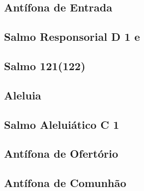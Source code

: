\subsection{Antífona de Entrada}\label{subsection:tempus-adventus/missa-2/introitus}

\subsection[Salmo Responsorial]{Salmo Responsorial \textmd{D 1 e}}\label{subsection:tempus-adventus/missa-2/psalmus-responsorius}
\subsection{Salmo 121(122)}

\AllowPageFlush

\subsection{Aleluia}\label{subsection:tempus-adventus/missa-2/alleluia}

\AllowPageFlush

\subsection[Salmo Aleluiático]{Salmo Aleluiático \textmd{C 1}}\label{subsection:tempus-adventus/missa-2/psalmus-alleluiaticus}

\AllowPageFlush

\subsection{Antífona de Ofertório}\label{subsection:tempus-adventus/missa-2/offertorium}

\AllowPageFlush

\subsection{Antífona de Comunhão}\label{subsection:tempus-adventus/missa-2/communio}
